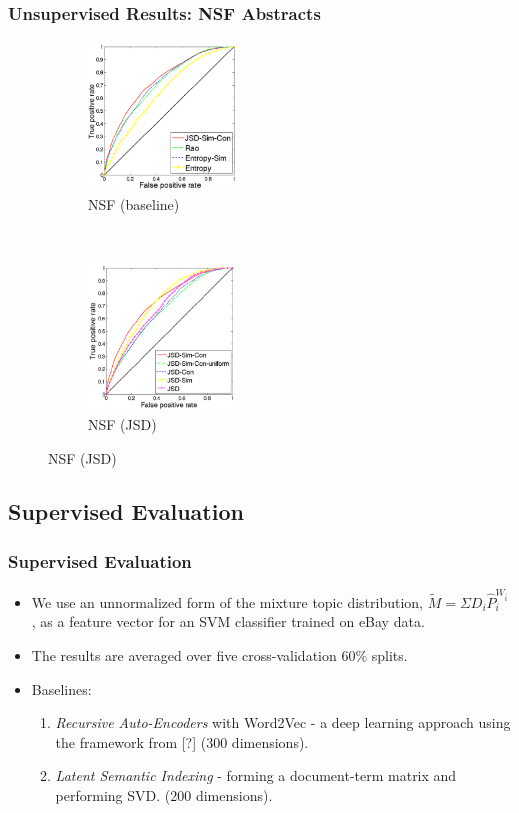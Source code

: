 \documentclass{beamer}
\begin{document}
\begin{frame}
\frametitle{Unsupervised Results: NSF Abstracts}
\begin{figure}
        \begin{subfigure}[b]{0.45\textwidth}
                \centering
                \includegraphics[width=40mm]{figures/nsf-comparison-kopia.png}
                \caption{NSF (baseline)}
                \label{fig:nsf-comparison}
        \end{subfigure}%
        ~ %
        \begin{subfigure}[b]{0.45\textwidth}
        	        \centering
                \includegraphics[width=40mm]{figures/nsf-breakdown-kopia.png}
               \caption{NSF (JSD)}
                \label{fig:nsf-breakdown}
        \end{subfigure}
\end{figure}
\end{frame}

\subsection{Supervised Evaluation}

\begin{frame}
\frametitle{Supervised Evaluation}
\begin{itemize}
\item We use an unnormalized form of the mixture topic distribution,
  $\tilde{M}=\Sigma D_i\hat{P}_i^{W_{\bar{i}}}$, as a feature vector
  for an SVM classifier trained on eBay data.
\item The results are averaged over five cross-validation $60\%$
  splits.
\item Baselines:
\begin{enumerate}
\item {\em Recursive Auto-Encoders} with Word2Vec - a deep learning approach
  using the framework from [?] (300 dimensions).
\item {\em Latent Semantic Indexing} - forming a document-term matrix
  and performing SVD. (200 dimensions).
\end{enumerate}
\end{itemize}
\end{frame}
\end{document}
